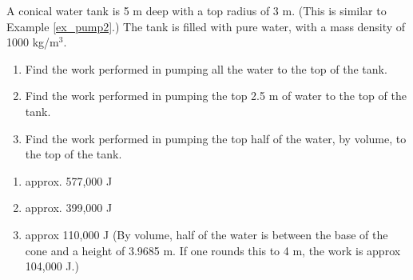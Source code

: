 {A conical water tank is 5 m deep with a top radius of 3 m. (This is similar to Example \ref{ex_pump2}.) The tank is filled with pure water, with a mass density of 1000 kg/m$^3$. 
	\begin{enumerate}
	\item		Find the work performed in pumping all the water to the top of the tank.
	\item		Find the work performed in pumping the top 2.5 m of water to the top of the tank.
	\item		Find the work performed in pumping the top half of the water, by volume, to the top of the tank.
	\end{enumerate}
}
{\begin{enumerate}
\item	approx. 577,000 J
\item	approx. 399,000 J
\item	approx 110,000 J  (By volume, half of the water is between the base of the cone and a height of 3.9685 m. If one rounds this to 4 m, the work is approx 104,000 J.)
\end{enumerate}
}
